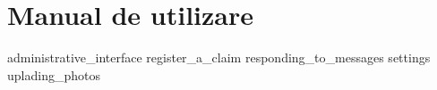 \chapter{Manual de utilizare}
{administrative_interface}
{register_a_claim}
{responding_to_messages}
{settings}
{uplading_photos}